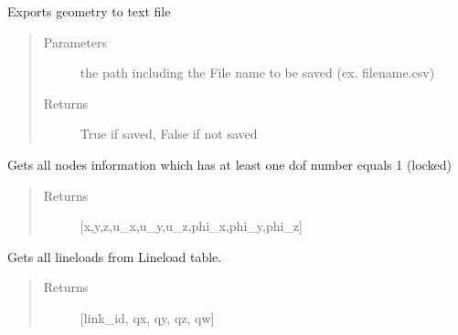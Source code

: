 \documentclass[letterpaper,10pt,english]{sphinxmanual}
\begin{document}
\begin{fulllineitems}
\begin{fulllineitems}
\end{fulllineitems}


\begin{fulllineitems}
\label{\detokenize{api:beamon.database.Database.export_text}}
Exports geometry to text file
\begin{quote}\begin{description}
\item[{Parameters}] \leavevmode
{} \textendash{} the path including the File name to be saved (ex. filename.csv)

\item[{Returns}] \leavevmode
True if saved, False if not saved

\end{description}\end{quote}

\end{fulllineitems}


\begin{fulllineitems}
\label{\detokenize{api:beamon.database.Database.get_all_dof}}
Gets all nodes information which has at least one dof number equals 1 (locked)
\begin{quote}\begin{description}
\item[{Returns}] \leavevmode
{[}x,y,z,u\_x,u\_y,u\_z,phi\_x,phi\_y,phi\_z{]}

\end{description}\end{quote}

\end{fulllineitems}


\begin{fulllineitems}
\label{\detokenize{api:beamon.database.Database.get_all_lineloads}}
Gets all lineloads from Lineload table.
\begin{quote}\begin{description}
\item[{Returns}] \leavevmode
{[}link\_id, qx, qy, qz, qw{]}


\end{description}
\end{quote}
\end{fulllineitems}
\end{fulllineitems}
\end{document}
